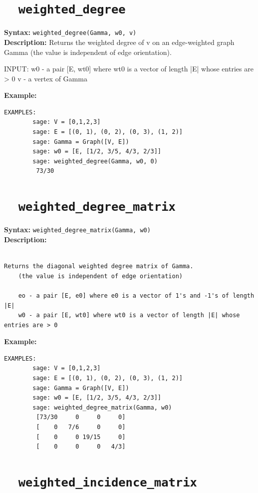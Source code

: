 \documentclass{article}
\begin{document}
\section{\tt \ \ weighted\_degree}

\textbf{Syntax:} \verb}weighted_degree(Gamma, w0, v)}\\

\textbf{Description:}
Returns the weighted degree of v on an edge-weighted graph Gamma (the value is
independent of edge orientation).

INPUT:
    w0 - a pair [E, wt0] where wt0 is a vector of length |E| whose entries are > 0
    v - a vertex of Gamma

\textbf{Example:}
\begin{verbatim}
EXAMPLES:
        sage: V = [0,1,2,3]
        sage: E = [(0, 1), (0, 2), (0, 3), (1, 2)]
        sage: Gamma = Graph([V, E])
        sage: w0 = [E, [1/2, 3/5, 4/3, 2/3]]
        sage: weighted_degree(Gamma, w0, 0)
         73/30
\end{verbatim}

\section{\tt \ \ weighted\_degree\_matrix}

\textbf{Syntax:} \verb}weighted_degree_matrix(Gamma, w0)}\\

\textbf{Description:}
\begin{verbatim}

Returns the diagonal weighted degree matrix of Gamma.
    (the value is independent of edge orientation)

    eo - a pair [E, e0] where e0 is a vector of 1's and -1's of length |E|
    w0 - a pair [E, wt0] where wt0 is a vector of length |E| whose entries are > 0
\end{verbatim}

\textbf{Example:}
\begin{verbatim}
EXAMPLES:
        sage: V = [0,1,2,3]
        sage: E = [(0, 1), (0, 2), (0, 3), (1, 2)]
        sage: Gamma = Graph([V, E])
        sage: w0 = [E, [1/2, 3/5, 4/3, 2/3]]
        sage: weighted_degree_matrix(Gamma, w0)
         [73/30     0     0     0]
         [    0   7/6     0     0]
         [    0     0 19/15     0]
         [    0     0     0   4/3]
\end{verbatim}


\section{\tt \ \ weighted\_incidence\_matrix}
\end{document}
